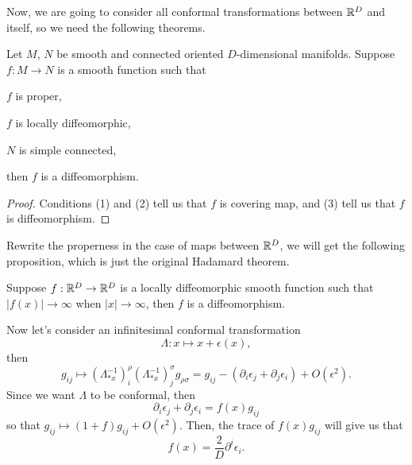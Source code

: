 Now, we are going to consider all conformal transformations between $\mathbb{R}^D$ and itself, so we need the following theorems.

\begin{thm}
Let $M$, $N$ be smooth and connected oriented $D$-dimensional
manifolds. Suppose $f:M\to N$ is a smooth function such that
\begin{compactenum}[\quad (1).]
	\item $f$ is proper,
	\item $f$ is locally diffeomorphic,
	\item $N$ is simple connected,
\end{compactenum}
then $f$ is a diffeomorphism.
\end{thm}

\begin{proof}
	Conditions (1) and (2) tell us that $f$ is covering map, and
	(3) tell us that $f$ is diffeomorphism.
\end{proof}

Rewrite the properness in the case of maps between $\mathbb{R}^D$, we will get
the following proposition, which is just the original Hadamard theorem.

\begin{pro}
	Suppose $f:\mathbb{R}^D\to \mathbb{R}^D$ is a locally diffeomorphic 
	smooth function such that $|f(x)|\to \infty$ when $|x|\to \infty$,
	then $f$ is a diffeomorphism.
\end{pro}

Now let's consider an infinitesimal conformal transformation 
\[
	\Lambda:x\mapsto x+\epsilon(x),
\]
then
\[
	g_{ij}\mapsto (\Lambda^{-1}_{*x})^\rho_i(\Lambda^{-1}_{*x})^\sigma_j g_{\rho\sigma}=g_{ij}-(\partial_i \epsilon_j+\partial_j \epsilon_i)+O(\epsilon^2).
\]
Since we want $\Lambda$ to be conformal, then
\[
	\partial_i \epsilon_j+\partial_j \epsilon_i=f(x)g_{ij}
\]
so that $g_{ij}\mapsto (1+f)g_{ij}+O(\epsilon^2)$. Then, the trace of $f(x)g_{ij}$ will give us that
\[
	f(x)=\frac{2}{D}\partial^i\epsilon_i.
\]